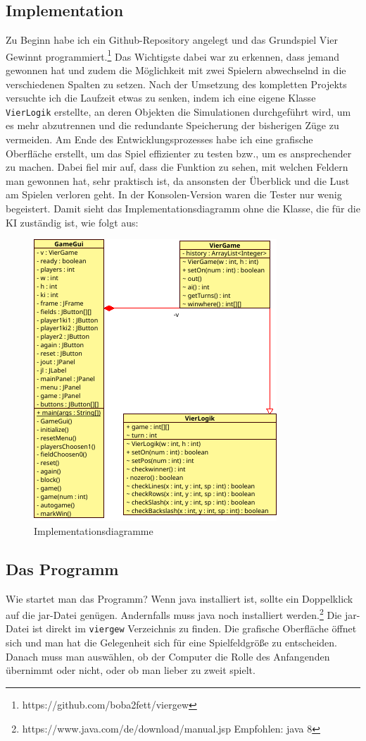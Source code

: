 \documentclass[12pt,a4paper]{article}
\def\code#1{\texttt{#1}}
\begin{document}
	\subsection{Implementation}
	Zu Beginn habe ich ein Github-Repository angelegt und das Grundspiel Vier Gewinnt programmiert.\footnote{https://github.com/boba2fett/viergew} Das Wichtigste dabei war zu erkennen, dass jemand gewonnen hat und zudem die Möglichkeit mit zwei Spielern abwechselnd in die verschiedenen Spalten zu setzen.
	Nach der Umsetzung des kompletten Projekts versuchte ich die Laufzeit etwas zu senken, indem ich eine eigene Klasse \code{VierLogik} erstellte, an deren Objekten die Simulationen durchgeführt wird, um es mehr abzutrennen und die redundante Speicherung der bisherigen Züge zu vermeiden. Am Ende des Entwicklungsprozesses habe ich eine grafische Oberfläche erstellt, um das Spiel effizienter zu testen bzw., um es ansprechender zu machen. Dabei fiel mir auf, dass die Funktion zu sehen, mit welchen Feldern man gewonnen hat, sehr praktisch ist, da ansonsten der Überblick und die Lust am Spielen verloren geht. In der Konsolen-Version waren die Tester nur wenig begeistert.
	Damit sieht das Implementationsdiagramm ohne die Klasse, die für die KI zuständig ist, wie folgt aus:
\begin{figure}[h]
	\centering
	\label{Impementationsdiagramm}
	\includegraphics[width=0.7\linewidth, height=0.4\textheight]{maybe/Klassendiagramme}
	\caption{Implementationsdiagramme}
	\label{fig:klassendiagramme}
\end{figure}
\newpage
	\subsection{Das Programm}
	Wie startet man das Programm? Wenn java installiert ist, sollte ein Doppelklick auf die jar-Datei genügen. Andernfalls muss java noch installiert werden.\footnote{https://www.java.com/de/download/manual.jsp \space{} Empfohlen: java 8} Die jar-Datei ist direkt im \code{viergew} Verzeichnis zu finden. Die grafische Oberfläche öffnet sich und man hat die Gelegenheit sich für eine Spielfeldgröße zu entscheiden. Danach muss man auswählen, ob der Computer die Rolle des Anfangenden übernimmt oder nicht, oder ob man lieber zu zweit spielt.\\
\end{document}
